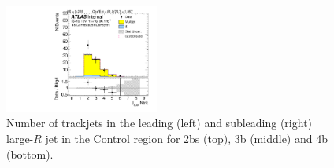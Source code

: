 \begin{figure}[htbp!]
\begin{center}
\includegraphics[width=0.45\textwidth,angle=-90]{figures/boosted/Control/b77_FourTag_Control_sublHCand_ntrk.pdf}
  \caption{Number of trackjets in the leading (left) and subleading (right) large-$R$ jet in the Control region for 2bs (top), 3b (middle) and 4b (bottom).}
  \label{fig:boosted-ntrk-Control}
\end{center}
\end{figure}

